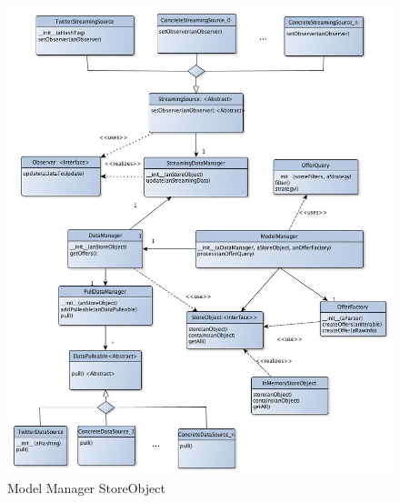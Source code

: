 \documentclass[10pt, a4paper]{article}
\begin{document}
\begin{figure}[H]
\centering
\includegraphics[scale=0.6]{graphics/model_manager_storeObject_class.jpg}
\caption{Model Manager StoreObject}
\end{figure}

\newpage
\end{document}
